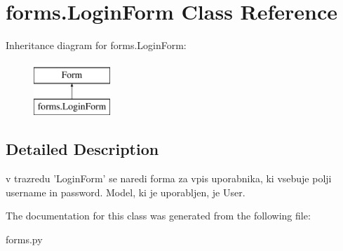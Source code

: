 \section{forms.\+Login\+Form Class Reference}
\label{classforms_1_1_login_form}
Inheritance diagram for forms.\+Login\+Form\+:\begin{figure}[H]
\begin{center}
\leavevmode
\includegraphics[height=2.000000cm]{classforms_1_1_login_form}
\end{center}
\end{figure}


\subsection{Detailed Description}
\begin{DoxyVerb}    v trazredu 'LoginForm' se naredi forma za vpis uporabnika, ki vsebuje polji username in password. Model, ki je uporabljen, je User.
\end{DoxyVerb}
 

The documentation for this class was generated from the following file\+:\begin{DoxyCompactItemize}
\item 
forms.\+py\end{DoxyCompactItemize}

